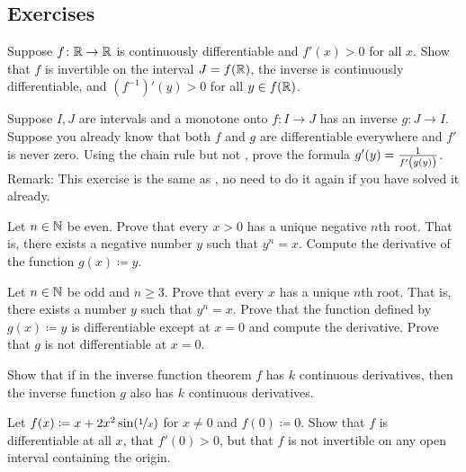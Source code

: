 \subsection{Exercises}

\begin{exercise}
Suppose $f \colon {\mathbb{R}} \to {\mathbb{R}}$ is continuously differentiable and
$f'(x) > 0$ for all $x$.  Show that $f$ is invertible on the interval $J =
f({\mathbb{R}})$, the inverse is continuously differentiable, and ${(f^{-1})}'(y) >
0$ for all $y \in f({\mathbb{R}})$.
\end{exercise}

\begin{exercise}
\pagebreak[2]
Suppose $I,J$ are intervals and a monotone onto $f \colon I \to J$ has an inverse $g \colon J \to I$.
Suppose you already know that both $f$ and $g$ are differentiable
everywhere and $f'$ is never zero.  Using the chain rule but not
, prove the
formula $g'(y) = \frac{1}{f'\left(\vphantom{1_1^1}g(y)\right)}$. %
Remark: This exercise is the same as ,
no need to do it again if you have
solved it already.
\end{exercise}

\begin{exercise}
\pagebreak[2]
Let $n\in {\mathbb{N}}$ be even.
Prove that every $x > 0$ has a unique negative $n$th root.
That is, there exists a negative number $y$ such that $y^n = x$.
Compute the derivative
of the function $g(x) \coloneqq y$.
\end{exercise}

\begin{exercise} \label{exercise:oddroot}
Let $n \in {\mathbb{N}}$ be odd and $n \geq 3$.
Prove that every $x$ has a unique $n$th root.
That is, there exists a number $y$ such that $y^n = x$.  Prove that
the function defined by $g(x) \coloneqq y$ is differentiable except at $x=0$
and compute the derivative.  Prove that $g$ is not differentiable at $x=0$.
\end{exercise}

\begin{exercise}
Show that if in the inverse function theorem $f$ has $k$ continuous
derivatives, then the inverse function $g$ also has $k$ continuous
derivatives.
\end{exercise}

\begin{exercise}
Let $f(x) \coloneqq x + 2 x^2 \sin(\nicefrac{1}{x})$ for $x \neq 0$ and
$f(0) \coloneqq 0$.  Show that $f$ is differentiable at all $x$, that $f'(0) > 0$,
but that $f$ is not invertible
on any open interval containing the origin.
\end{exercise}

